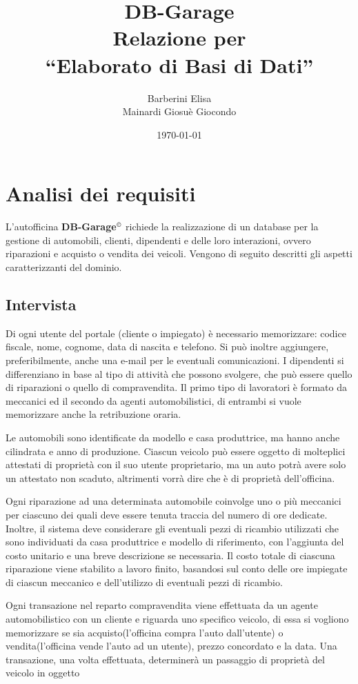 \documentclass[a4paper,12pt]{report}
\title{\textbf{DB-Garage}\\Relazione per\\``Elaborato di Basi di Dati''}
\author{Barberini Elisa\\Mainardi Giosuè Giocondo}
\date{\today}
\begin{document}
\maketitle

\tableofcontents

\chapter{Analisi dei requisiti}
L'autofficina \textbf{DB-Garage}$^{\copyright}$ richiede la realizzazione di un database per la gestione di automobili,
%
clienti, dipendenti e delle loro interazioni, ovvero riparazioni e acquisto o vendita dei veicoli. Vengono di seguito 
%
descritti gli aspetti caratterizzanti del dominio.

\section{Intervista}

Di ogni utente del portale (cliente o impiegato) è necessario memorizzare: codice fiscale, nome, cognome,
%
data di nascita e telefono. Si può inoltre aggiungere, preferibilmente, anche una e-mail per le eventuali comunicazioni. 
%
I dipendenti si differenziano in base al tipo di attività che possono svolgere, che può essere quello di riparazioni o 
%
quello di compravendita.
%
Il primo tipo di lavoratori è formato da meccanici ed il secondo da agenti automobilistici, di entrambi si vuole memorizzare 
%
anche la retribuzione oraria.

Le automobili sono identificate da modello e casa produttrice, ma hanno anche cilindrata e anno di produzione.
%
Ciascun veicolo può essere oggetto di molteplici attestati di proprietà con il suo utente proprietario, 
%
ma un auto potrà avere solo un attestato non scaduto, altrimenti vorrà dire che è di proprietà dell'officina.

Ogni riparazione ad una determinata automobile coinvolge uno o più meccanici per ciascuno dei quali deve 
%
essere tenuta traccia del numero di ore dedicate.
%
Inoltre, il sistema deve considerare gli eventuali pezzi di ricambio utilizzati che sono individuati da 
%
casa produttrice e modello di riferimento, con l'aggiunta del costo unitario e una breve descrizione se necessaria.
%
Il costo totale di ciascuna riparazione viene stabilito a lavoro finito, basandosi sul conto delle ore 
%
impiegate di ciascun meccanico e dell’utilizzo di eventuali pezzi di ricambio.

Ogni transazione nel reparto compravendita viene effettuata da un agente automobilistico con un cliente 
%
e riguarda uno specifico veicolo, di essa si vogliono memorizzare se sia acquisto(l'officina compra l'auto 
%
dall'utente) o vendita(l'officina vende l'auto ad un utente), prezzo concordato e la data. 
% 
Una transazione, una volta effettuata, determinerà un passaggio di proprietà del veicolo in oggetto
\end{document}
